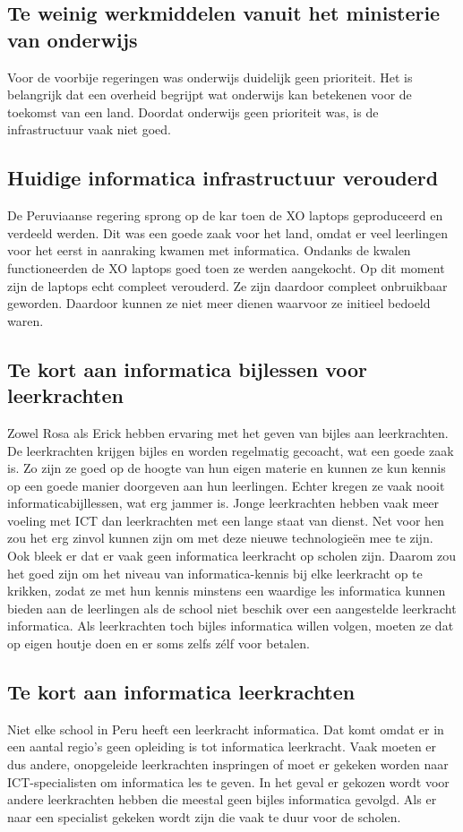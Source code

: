 \subsection{Te weinig werkmiddelen vanuit het ministerie van onderwijs}
Voor de voorbije regeringen was onderwijs duidelijk geen prioriteit. Het is belangrijk dat een overheid begrijpt wat onderwijs kan betekenen voor de toekomst van een land. Doordat onderwijs geen prioriteit was, is de infrastructuur vaak niet goed. 

\subsection{Huidige informatica infrastructuur verouderd}
De Peruviaanse regering sprong op de kar toen de XO laptops geproduceerd en verdeeld werden. Dit was een goede zaak voor het land, omdat er veel leerlingen voor het eerst in aanraking kwamen met informatica. Ondanks de kwalen functioneerden de XO laptops goed toen ze werden aangekocht. Op dit moment zijn de laptops echt compleet verouderd. Ze zijn daardoor compleet onbruikbaar geworden. Daardoor kunnen ze niet meer dienen waarvoor ze initieel bedoeld waren.

\subsection{Te kort aan informatica bijlessen voor leerkrachten}
Zowel Rosa als Erick hebben ervaring met het geven van bijles aan leerkrachten. De leerkrachten krijgen bijles en worden regelmatig gecoacht, wat een goede zaak is. Zo zijn ze goed op de hoogte van hun eigen materie en kunnen ze kun kennis op een goede manier doorgeven aan hun leerlingen. Echter kregen ze vaak nooit informaticabijllessen, wat erg jammer is. Jonge leerkrachten hebben vaak meer voeling met ICT dan leerkrachten met een lange staat van dienst. Net voor hen zou het erg zinvol kunnen zijn om met deze nieuwe technologieën mee te zijn. Ook bleek er dat er vaak geen informatica leerkracht op scholen zijn. Daarom zou het goed zijn om het niveau van informatica-kennis bij elke leerkracht op te krikken, zodat ze met hun kennis minstens een waardige les informatica kunnen bieden aan de leerlingen als de school niet beschik over een aangestelde leerkracht informatica. Als leerkrachten toch bijles informatica willen volgen, moeten ze dat op eigen houtje doen en er soms zelfs zélf voor betalen.

\subsection{Te kort aan informatica leerkrachten}
Niet elke school in Peru heeft een leerkracht informatica. Dat komt omdat er in een aantal regio's geen opleiding is tot informatica leerkracht. Vaak moeten er dus andere, onopgeleide leerkrachten inspringen of moet er gekeken worden naar ICT-specialisten om informatica les te geven. In het geval er gekozen wordt voor andere leerkrachten hebben die meestal geen bijles informatica gevolgd. Als er naar een specialist gekeken wordt zijn die vaak te duur voor de scholen. 

